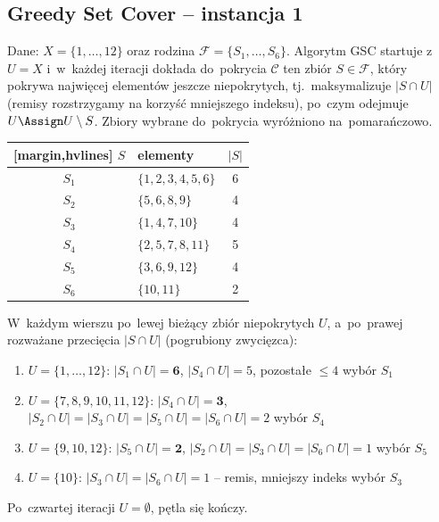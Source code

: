 \subsection{Greedy Set Cover -- instancja 1}

Dane: $X = \{1, \ldots, 12\}$ oraz rodzina $\mathcal{F} = \{S_1, \ldots, S_6\}$.
Algorytm \textsc{GSC} startuje z~$U = X$ i~w~każdej iteracji dokłada do~pokrycia
$\mathcal{C}$ ten zbiór $S \in \mathcal{F}$, który pokrywa najwięcej elementów
jeszcze niepokrytych, tj.\ maksymalizuje $|S \cap U|$ (remisy rozstrzygamy na
korzyść mniejszego indeksu), po~czym odejmuje $U \Assign U \setminus S$. Zbiory
wybrane do~pokrycia wyróżniono na~\textcolor{accentB}{pomarańczowo}.

\begin{aztable}
	\centering
	\renewcommand{\arraystretch}{1.2}
	\begin{NiceTabular}{c|l|c}[margin,hvlines]
		$S$                  & elementy                & $|S|$ \\
		\hline
		\color{accentB}$S_1$ & \color{accentB}$\{1,2,3,4,5,6\}$ & \color{accentB}6 \\
		$S_2$                & $\{5,6,8,9\}$           & 4 \\
		\color{accentB}$S_3$ & \color{accentB}$\{1,4,7,10\}$    & \color{accentB}4 \\
		\color{accentB}$S_4$ & \color{accentB}$\{2,5,7,8,11\}$  & \color{accentB}5 \\
		\color{accentB}$S_5$ & \color{accentB}$\{3,6,9,12\}$    & \color{accentB}4 \\
		$S_6$                & $\{10,11\}$             & 2
	\end{NiceTabular}
\end{aztable}

\begin{dygresja}
	W~każdym wierszu po~lewej bieżący zbiór niepokrytych $U$, a~po~prawej
	rozważane przecięcia $|S \cap U|$ (pogrubiony zwycięzca):
	\begin{enumerate}[nosep]
		\item $U = \{1,\ldots,12\}$:\quad
		      $|S_1 \cap U| = \mathbf{6}$, $|S_4 \cap U| = 5$, pozostałe $\leq 4$
		      \hfill wybór $S_1$
		\item $U = \{7,8,9,10,11,12\}$:\quad
		      $|S_4 \cap U| = \mathbf{3}$, $|S_2 \cap U| = |S_3 \cap U| = |S_5 \cap U|
		      = |S_6 \cap U| = 2$
		      \hfill wybór $S_4$
		\item $U = \{9,10,12\}$:\quad
		      $|S_5 \cap U| = \mathbf{2}$, $|S_2 \cap U| = |S_3 \cap U|
		      = |S_6 \cap U| = 1$
		      \hfill wybór $S_5$
		\item $U = \{10\}$:\quad
		      $|S_3 \cap U| = |S_6 \cap U| = 1$ -- remis, mniejszy indeks
		      \hfill wybór $S_3$
	\end{enumerate}
	Po~czwartej iteracji $U = \emptyset$, pętla się kończy.
\end{dygresja}

